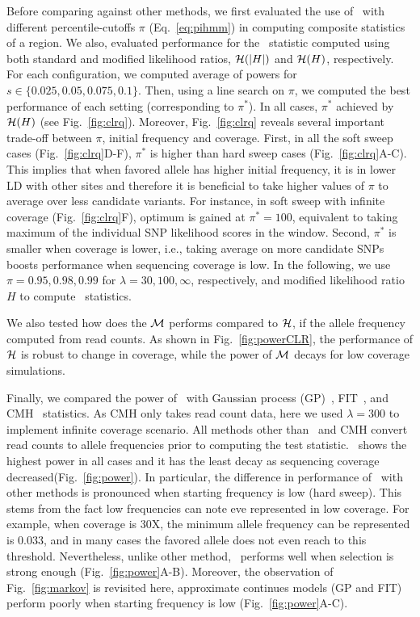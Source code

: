 Before comparing against other methods, we first evaluated the use of \comale\ 
with different percentile-cutoffs $\pi$ (Eq.~\ref{eq:pihmm})
in computing composite statistics of a region. 
We also, evaluated 
performance for the \comale\ statistic computed using both standard and 
modified likelihood ratios, ${\cal H}(|H|)$ and ${\cal H}(H)$, respectively.
For each configuration, we computed average of powers for 
$s\in\{0.025,0.05,0.075,0.1\}$. 
Then, using a line search on $\pi$, we computed the best performance of each 
setting (corresponding to $\pi^*$). In all cases, $\pi^*$ achieved by ${\cal H}(H)$ 
(see Fig.~\ref{fig:clrq}).
Moreover, Fig.~\ref{fig:clrq} reveals several important trade-off between 
$\pi$, initial frequency and coverage.
First, in all the soft sweep cases (Fig.~\ref{fig:clrq}D-F), $\pi^*$ is higher 
than hard sweep cases (Fig.~\ref{fig:clrq}A-C). This implies that when 
favored allele has higher initial frequency, it 
is in lower LD with other sites and therefore it is beneficial to take higher 
values of $\pi$ to average over less candidate variants. For instance, in soft 
sweep with infinite coverage 
(Fig.~\ref{fig:clrq}F), optimum is gained at $\pi^*=100$, equivalent to taking 
maximum of the individual SNP likelihood scores in the window.
Second, $\pi^*$ is smaller when coverage is lower, i.e., taking average on more 
candidate SNPs boosts performance when sequencing coverage is low.
In the following, we use $\pi=0.95,0.98, 0.99$ for $\lambda=30,100,\infty$, 
respectively, and modified likelihood ratio $H$ to 
compute \comale\ statistics.

We also tested how does the ${\cal M}$ performs compared to ${\cal H}$,
if the allele frequency computed from read counts.
As shown in Fig.~\ref{fig:powerCLR}, the performance of
${\cal H}$ is robust to change in coverage, while the power of
${\cal M}$ decays for low coverage simulations.

Finally, we compared the power of \comale\ with Gaussian process
(GP)~\cite{Terhorst2015Multi}, FIT~\cite{feder2014Identifying}, and
CMH~\cite{agresti2011categorical} statistics. 
As CMH only takes read count data, here we used $\lambda=300$ to implement 
infinite coverage scenario. All methods other than \comale\ and CMH convert 
read counts to allele frequencies prior to computing the test statistic. 
\comale\ shows the highest power in all cases and it has the least decay as 
sequencing coverage decreased(Fig.~\ref{fig:power}). In particular, the 
difference in performance of \comale\ with other methods is pronounced when 
starting frequency is low (hard sweep). This stems from the fact low 
frequencies can note eve represented in low coverage. For example, when 
coverage is 30X, the minimum allele frequency can be represented is 0.033, and 
in many cases the favored allele does not even reach to this threshold. 
Nevertheless, unlike other method, \comale\ performs well when selection is 
strong enough (Fig.~\ref{fig:power}A-B). Moreover, the observation of 
Fig.~\ref{fig:markov} is revisited here, approximate continues models (GP and 
FIT) perform poorly when starting frequency is low (Fig.~\ref{fig:power}A-C).


